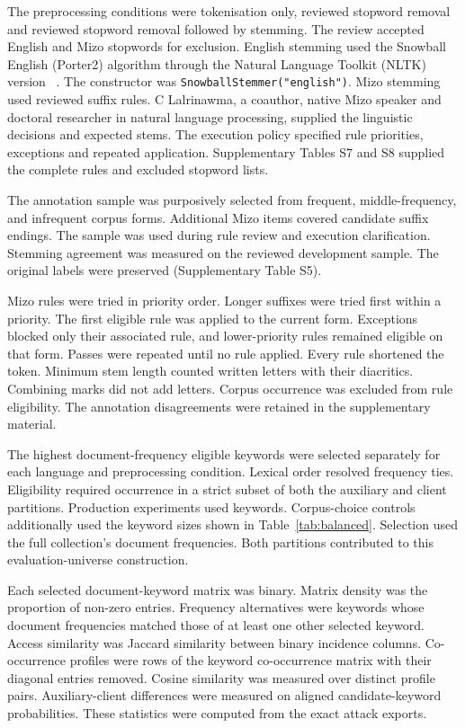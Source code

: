 \documentclass[12pt]{article}
\begin{document}
The preprocessing conditions were tokenisation only, reviewed stopword removal and reviewed stopword removal followed by stemming. The review accepted \EnglishStopwords{} English and \MizoStopwords{} Mizo stopwords for exclusion. English stemming used the Snowball English (Porter2) algorithm through the Natural Language Toolkit (NLTK) version \NltkVersion{}~\cite{snowball}. The constructor was \texttt{SnowballStemmer("english")}. Mizo stemming used \MizoRules{} reviewed suffix rules. C Lalrinawma, a coauthor, native Mizo speaker and doctoral researcher in natural language processing, supplied the linguistic decisions and expected stems. The execution policy specified rule priorities, exceptions and repeated application. Supplementary Tables S7 and S8 supplied the complete rules and excluded stopword lists.

The annotation sample was purposively selected from frequent, middle-frequency, and infrequent corpus forms. Additional Mizo items covered candidate suffix endings. The sample was used during rule review and execution clarification. Stemming agreement was measured on the reviewed development sample. The original labels were preserved (Supplementary Table S5).

Mizo rules were tried in priority order. Longer suffixes were tried first within a priority. The first eligible rule was applied to the current form. Exceptions blocked only their associated rule, and lower-priority rules remained eligible on that form. Passes were repeated until no rule applied. Every rule shortened the token. Minimum stem length counted written letters with their diacritics. Combining marks did not add letters. Corpus occurrence was excluded from rule eligibility. The annotation disagreements were retained in the supplementary material.

The highest document-frequency eligible keywords were selected separately for each language and preprocessing condition. Lexical order resolved frequency ties. Eligibility required occurrence in a strict subset of both the auxiliary and client partitions. Production experiments used \Keywords{} keywords. Corpus-choice controls additionally used the keyword sizes shown in Table~\ref{tab:balanced}. Selection used the full collection's document frequencies. Both partitions contributed to this evaluation-universe construction.

Each selected document-keyword matrix was binary. Matrix density was the proportion of non-zero entries. Frequency alternatives were keywords whose document frequencies matched those of at least one other selected keyword. Access similarity was Jaccard similarity between binary incidence columns. Co-occurrence profiles were rows of the keyword co-occurrence matrix with their diagonal entries removed. Cosine similarity was measured over distinct profile pairs. Auxiliary-client differences were measured on aligned candidate-keyword probabilities. These statistics were computed from the exact attack exports.
\end{document}
